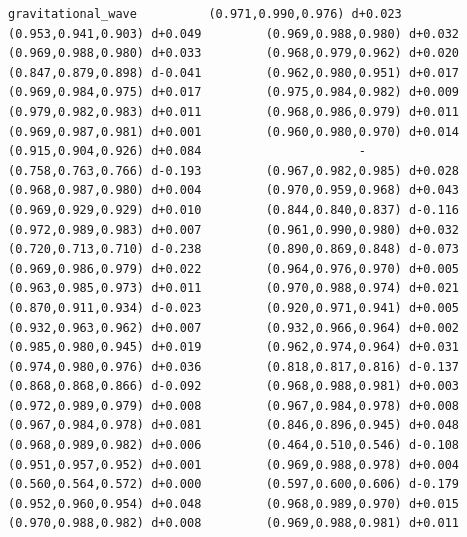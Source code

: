 \documentclass[11pt, letterpaper, openany]{book}
\begin{document}
\begin{empiricalbox}
\begin{lstlisting}[style=terminal]
gravitational_wave          (0.971,0.990,0.976) d+0.023         (0.953,0.941,0.903) d+0.049         (0.969,0.988,0.980) d+0.032         (0.969,0.988,0.980) d+0.033         (0.968,0.979,0.962) d+0.020         (0.847,0.879,0.898) d-0.041         (0.962,0.980,0.951) d+0.017         (0.969,0.984,0.975) d+0.017         (0.975,0.984,0.982) d+0.009         (0.979,0.982,0.983) d+0.011         (0.968,0.986,0.979) d+0.011         (0.969,0.987,0.981) d+0.001         (0.960,0.980,0.970) d+0.014         (0.915,0.904,0.926) d+0.084                      -                      (0.758,0.763,0.766) d-0.193         (0.967,0.982,0.985) d+0.028         (0.968,0.987,0.980) d+0.004         (0.970,0.959,0.968) d+0.043         (0.969,0.929,0.929) d+0.010         (0.844,0.840,0.837) d-0.116         (0.972,0.989,0.983) d+0.007         (0.961,0.990,0.980) d+0.032         (0.720,0.713,0.710) d-0.238         (0.890,0.869,0.848) d-0.073         (0.969,0.986,0.979) d+0.022         (0.964,0.976,0.970) d+0.005         (0.963,0.985,0.973) d+0.011         (0.970,0.988,0.974) d+0.021         (0.870,0.911,0.934) d-0.023         (0.920,0.971,0.941) d+0.005         (0.932,0.963,0.962) d+0.007         (0.932,0.966,0.964) d+0.002         (0.985,0.980,0.945) d+0.019         (0.962,0.974,0.964) d+0.031         (0.974,0.980,0.976) d+0.036         (0.818,0.817,0.816) d-0.137         (0.868,0.868,0.866) d-0.092         (0.968,0.988,0.981) d+0.003         (0.972,0.989,0.979) d+0.008         (0.967,0.984,0.978) d+0.008         (0.967,0.984,0.978) d+0.081         (0.846,0.896,0.945) d+0.048         (0.968,0.989,0.982) d+0.006         (0.464,0.510,0.546) d-0.108         (0.951,0.957,0.952) d+0.001         (0.969,0.988,0.978) d+0.004         (0.560,0.564,0.572) d+0.000         (0.597,0.600,0.606) d-0.179         (0.952,0.960,0.954) d+0.048         (0.968,0.989,0.970) d+0.015         (0.970,0.988,0.982) d+0.008         (0.969,0.988,0.981) d+0.011     

\end{lstlisting}
\end{empiricalbox}
\end{document}
